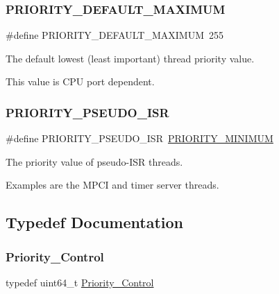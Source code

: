 \subsubsection{\texorpdfstring{PRIORITY\_DEFAULT\_MAXIMUM}{PRIORITY\_DEFAULT\_MAXIMUM}}
{\footnotesize\ttfamily \#define P\+R\+I\+O\+R\+I\+T\+Y\+\_\+\+D\+E\+F\+A\+U\+L\+T\+\_\+\+M\+A\+X\+I\+M\+UM~255}



The default lowest (least important) thread priority value. 

This value is C\+PU port dependent. \mbox{\label{group__RTEMSScorePriority_gaa1513d851789c6be74feab5874c30ec8}} 
\subsubsection{\texorpdfstring{PRIORITY\_PSEUDO\_ISR}{PRIORITY\_PSEUDO\_ISR}}
{\footnotesize\ttfamily \#define P\+R\+I\+O\+R\+I\+T\+Y\+\_\+\+P\+S\+E\+U\+D\+O\+\_\+\+I\+SR~\mbox{\hyperlink{group__RTEMSScorePriority_ga4e541913996f017db9428a9fe621d5d7}{P\+R\+I\+O\+R\+I\+T\+Y\+\_\+\+M\+I\+N\+I\+M\+UM}}}



The priority value of pseudo-\/\+I\+SR threads. 

Examples are the M\+P\+CI and timer server threads. 

\subsection{Typedef Documentation}
\mbox{\label{group__RTEMSScorePriority_ga59d02b58072d31a9a1cfe644557aefe2}} 
\subsubsection{\texorpdfstring{Priority\_Control}{Priority\_Control}}
{\footnotesize\ttfamily typedef uint64\+\_\+t \mbox{\hyperlink{group__RTEMSScorePriority_ga59d02b58072d31a9a1cfe644557aefe2}{Priority\+\_\+\+Control}}}



